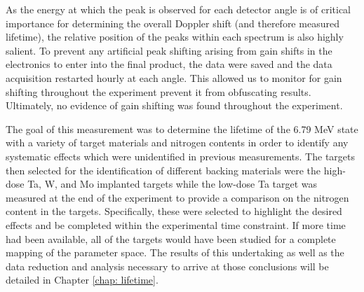 As the energy at which the peak is observed for each detector angle is of critical importance for determining the overall Doppler shift (and therefore measured lifetime), the relative position of the peaks within each spectrum is also highly salient. To prevent any artificial peak shifting arising from gain shifts in the electronics to enter into the final product, the data were saved and the data acquisition restarted hourly at each angle. This allowed us to monitor for gain shifting throughout the experiment prevent it from obfuscating results. Ultimately, no evidence of gain shifting was found throughout the experiment.

The goal of this measurement was to determine the lifetime of the 6.79 MeV state with a variety of target materials and nitrogen contents in order to identify any systematic effects which were unidentified in previous measurements. The targets then selected for the identification of different backing materials were the high-dose Ta, W, and Mo implanted targets while the low-dose Ta target was measured at the end of the experiment to provide a comparison on the nitrogen content in the targets. Specifically, these were selected to highlight the desired effects and be completed within the experimental time constraint. If more time had been available, all of the targets would have been studied for a complete mapping of the parameter space. The results of this undertaking as well as the data reduction and analysis necessary to arrive at those conclusions will be detailed in Chapter \ref{chap: lifetime}.



%
% 
% 
